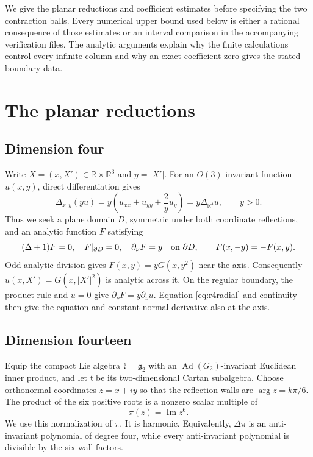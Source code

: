 \documentclass[11pt]{amsart}
\theoremstyle{remark}
\numberwithin{equation}{section}
\newcommand{\R}{\mathbb R}
\newcommand{\Ad}{\operatorname{Ad}}
\newcommand{\im}{\operatorname{Im}}
\newcommand{\abs}[1]{\lvert#1\rvert}
\newcommand{\kf}{\mathfrak k}
\newcommand{\tf}{\mathfrak t}
\begin{document}
We give the planar reductions and coefficient estimates before specifying
the two contraction balls. Every numerical upper bound used below is
either a rational consequence of those estimates or an interval
comparison in the accompanying verification files. The analytic
arguments explain why the finite calculations control every infinite
column and why an exact coefficient zero gives the stated boundary data.

\section{The planar reductions}\label{sec:reductions}
\subsection{Dimension four}
Write $X=(x,X')\in\R\times\R^3$ and $y=\abs{X'}$. For an
$O(3)$-invariant function $u(x,y)$, direct differentiation gives
\begin{equation}\label{eq:r4radial}
 \Delta_{x,y}(yu)=y\left(u_{xx}+u_{yy}+\frac2y u_y\right)
                 =y\Delta_{\R^4}u,\qquad y>0.
\end{equation}
Thus we seek a plane domain $D$, symmetric under both coordinate
reflections, and an analytic function $F$ satisfying
\begin{equation}\label{eq:r4plane}
 (\Delta+1)F=0,\quad F|_{\partial D}=0,\quad
 \partial_\nu F=y\quad\hbox{on }\partial D,\qquad
 F(x,-y)=-F(x,y).
\end{equation}
Odd analytic division gives $F(x,y)=yG(x,y^2)$ near the axis. Consequently
$u(x,X')=G(x,\abs{X'}^2)$ is analytic across it. On the regular boundary,
the product rule and $u=0$ give $\partial_\nu F=y\partial_\nu u$.
Equation \eqref{eq:r4radial} and continuity then give the equation and
constant normal derivative also at the axis.

\subsection{Dimension fourteen}
Equip the compact Lie algebra $\kf=\mathfrak g_2$ with an
$\Ad(G_2)$-invariant Euclidean inner product, and let $\tf$ be its
two-dimensional Cartan subalgebra. Choose orthonormal coordinates
$z=x+iy$ so that the reflection walls are $\arg z=k\pi/6$. The product of
the six positive roots is a nonzero scalar multiple of
\[
 \pi(z)=\im z^6.
\]
We use this normalization of $\pi$. It is harmonic. Equivalently,
$\Delta\pi$ is an anti-invariant polynomial of degree four, while every
anti-invariant polynomial is divisible by the six wall factors.
\end{document}
